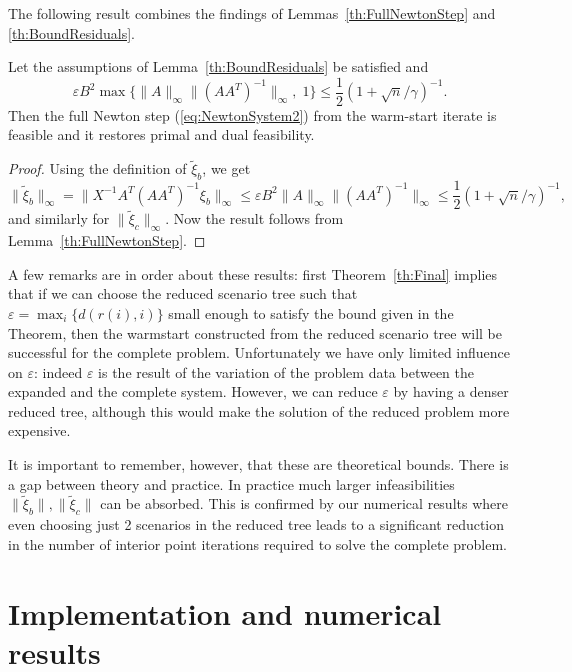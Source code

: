 The following result combines the findings of Lemmas~\ref{th:FullNewtonStep} 
and \ref{th:BoundResiduals}. 
%
\begin{theorem}  \label{th:Final}
Let the assumptions of Lemma~\ref{th:BoundResiduals} be satisfied and 
\[
\varepsilon B^2 \max\{\|A\|_\infty\|(AA^T)^{-1}\|_\infty, \; 1\} 
   \le \frac{1}{2} \left(1+\sqrt{n} / \gamma \right)^{-1}.
\]
Then the full Newton step (\ref{eq:NewtonSystem2})
from the warm-start iterate is feasible 
and it restores primal and dual feasibility.
\end{theorem}
%
\begin{proof}
Using the definition of $\tilde{\xi}_b$, we get
\[
\| \tilde{\xi}_b \|_{\infty} = \| X^{-1} A^T (AA^T)^{-1} \xi_b \|_{\infty} 
    \le
    \varepsilon B^2 \|A\|_{\infty} \|(AA^T)^{-1}\|_{\infty} 
    \le \frac{1}{2} \left(1+\sqrt{n} / \gamma \right)^{-1},
\]
and similarly for $\|\tilde{\xi}_c\|_{\infty}$.
Now the result follows from  Lemma~\ref{th:FullNewtonStep}. 
\end{proof}

A few remarks are in order about these results: first
Theorem~\ref{th:Final} implies that if we can choose the reduced
scenario tree such that $\varepsilon = \max_i\{d(r(i),i)\}$ small enough
to satisfy the bound given in the Theorem, then the warmstart
constructed from the reduced scenario tree will be successful for the
complete problem. Unfortunately we have only limited influence on
$\varepsilon$: indeed $\varepsilon$ is the result of the variation of
the problem data between the expanded and the complete system.
However, we can reduce $\varepsilon$ by having a
denser reduced tree, although this would make the solution of the
reduced problem more expensive.


It is important to remember, however,
that these are theoretical bounds. There is a gap between theory and
practice. In practice much larger infeasibilities 
$\|\tilde{\xi}_b\|, \|\tilde{\xi}_c\|$ can be absorbed. This is
confirmed by our numerical results where even choosing just 2
scenarios in the reduced tree leads to a significant reduction in the
number of interior point iterations required to solve the complete problem.


%
%
\section{Implementation and numerical results}
\label{sec:Results}

